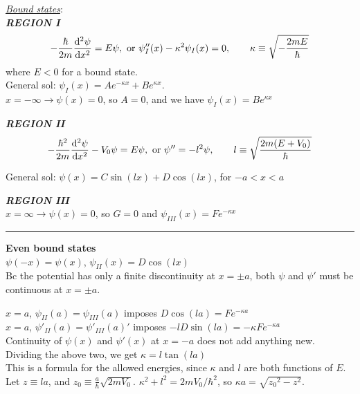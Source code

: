 
\textit{\underline{Bound states}}: \\

\textbf{\textit{REGION I}}
$$-\frac{\hbar}{2m} \dv[2]{\psi}{x} = E \psi, \textrm{ or } \psi''_{I}(x) - \kappa^2 \psi_{I}(x) = 0, \qquad \kappa \equiv \sqrt{-\frac{2mE}{\hbar}}$$
where $E < 0$ for a bound state. \\
General sol: $\psi_{I}(x) = Ae^{-\kappa x} + B e^{\kappa x}$. \\
$x = -\infty \rightarrow \psi(x) = 0$, so $A = 0$, and we have $\psi_{I}(x) = Be^{\kappa x}$

\smallskip

\textbf{\textit{REGION II}}
$$-\frac{\hbar^2}{2m} \dv[2]{\psi}{x} - V_0 \psi = E \psi, \textrm{ or } \psi'' = -l^2 \psi, \qquad l \equiv \sqrt{\frac{2m (E + V_0)}{\hbar}}$$

General sol: $\psi(x) = C \sin(lx) + D \cos(lx)$, for $-a < x < a$

\smallskip

\textbf{\textit{REGION III}} \\
$x = \infty \rightarrow \psi(x) = 0$, so $G=0$ and $\psi_{III}(x) = Fe^{-\kappa x}$

\medskip
\hrule height 0.3pt \thinspace

\textbf{Even bound states} \\
$\psi(-x) = \psi(x)$, $\psi_{II}(x) = D \cos(lx)$ \\
Bc the potential has only a finite discontinuity at $x = \pm a$, both $\psi$ and $\psi'$ must be continuous at $x = \pm a$.

$x = a$, $\psi_{II}(a) = \psi_{III}(a)$ imposes $D \cos(la) = F e^{-\kappa a}$ \\

$x = a$, $\psi'_{II}(a) = \psi'_{III}(a)'$ imposes $-lD \sin(la) = -\kappa F e^{-\kappa a}$ \\

Continuity of $\psi(x)$ and $\psi'(x)$ at $x = -a$ does not add anything new. \\

Dividing the above two, we get $\kappa = l \tan(la)$ \\
This is a formula for the allowed energies, since $\kappa$ and $l$ are both functions of $E$. Let $z \equiv la$, and $z_0 \equiv \frac{a}{\hbar} \sqrt{2m V_0}$. $\kappa^2 + l^2 = 2m V_0 / \hbar^2$, so $\kappa a = \sqrt{{z_0}^2 - z^2}$. \\


